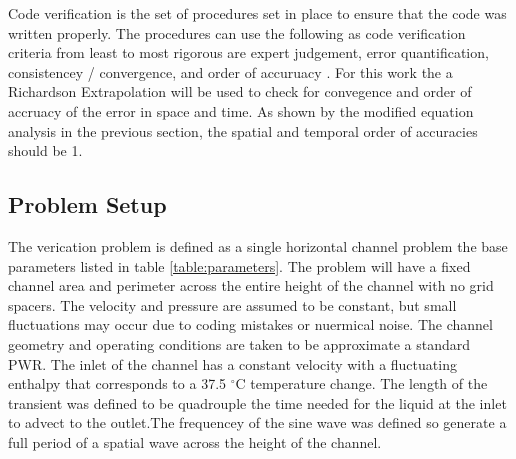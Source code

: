 \documentclass{mc2015}
\begin{document}
Code verification is the set of procedures set in place to ensure that the code
was written properly. The procedures can use the following as code verification
criteria from least to most rigorous are expert judgement, error quantification,
consistencey / convergence, and order of accuruacy \cite{VV_Book}. For this work
the a Richardson Extrapolation will be used to check for convegence and order of
accruacy of the error in space and time. As shown by the modified equation
analysis in the previous section, the spatial and temporal order of accuracies
should be 1. 
 
\subsection{Problem Setup}



The verication problem is defined as a single horizontal channel problem the
base parameters listed in table \ref{table:parameters}. The problem will have a
fixed channel area and perimeter across the entire height of the channel with no
grid spacers. The velocity and pressure are assumed to be constant, but small
fluctuations may occur due to coding mistakes or nuermical noise. The channel
geometry and operating conditions are taken to be approximate a standard PWR.
The inlet of the channel has a constant velocity with a fluctuating enthalpy
that corresponds to a 37.5 $^\circ$C temperature change.  The length
of the transient was defined to be quadrouple the time needed for the liquid at
the inlet to advect to the outlet.The frequencey of the sine wave was defined so
generate a full period of a spatial wave across the height of the channel. 
\end{document}

